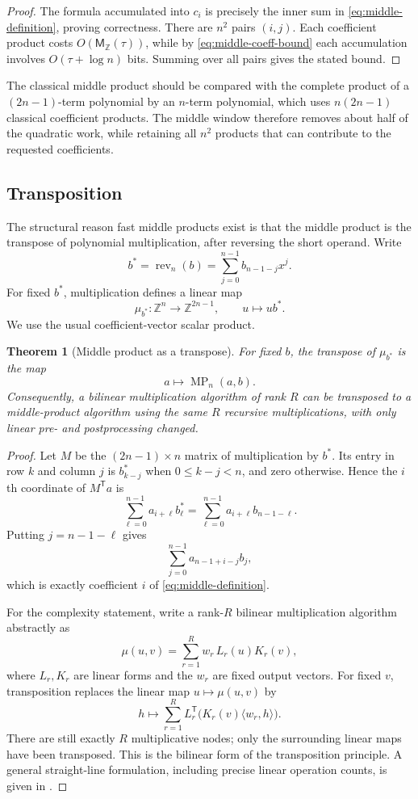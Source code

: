 \documentclass[11pt]{book}
\newtheorem{theorem}{Theorem}[section]
\theoremstyle{definition}
\newcommand{\ZZ}{\mathbb Z}
\newcommand{\MZ}{\mathsf M_{\ZZ}}
\begin{document}
\begin{proof}
The formula accumulated into $c_i$ is precisely the inner sum in
\eqref{eq:middle-definition}, proving correctness.  There are $n^2$ pairs
$(i,j)$.  Each coefficient product costs $O(\MZ(\tau))$, while by
\eqref{eq:middle-coeff-bound} each accumulation involves
$O(\tau+\log n)$ bits.  Summing over all pairs gives the stated bound.
\end{proof}

The classical middle product should be compared with the complete product of a
$(2n-1)$-term polynomial by an $n$-term polynomial, which uses
$n(2n-1)$ classical coefficient products.  The middle window therefore removes
about half of the quadratic work, while retaining all $n^2$ products that can
contribute to the requested coefficients.

\subsection{Transposition}

The structural reason fast middle products exist is that the middle product is
the transpose of polynomial multiplication, after reversing the short
operand.  Write
\[
 b^*=\operatorname{rev}_n(b)
      =\sum_{j=0}^{n-1}b_{n-1-j}x^j.
\]
For fixed $b^*$, multiplication defines a linear map
\[
 \mu_{b^*}:\ZZ^n\longrightarrow\ZZ^{2n-1},
 \qquad u\longmapsto u b^*.
\]
We use the usual coefficient-vector scalar product.

\begin{theorem}[Middle product as a transpose]\label{thm:middle-transpose}
For fixed $b$, the transpose of $\mu_{b^*}$ is the map
\[
 a\longmapsto\operatorname{MP}_n(a,b).
\]
Consequently, a bilinear multiplication algorithm of rank $R$ can be
transposed to a middle-product algorithm using the same $R$ recursive
multiplications, with only linear pre- and postprocessing changed.
\end{theorem}

\begin{proof}
Let $M$ be the $(2n-1)\times n$ matrix of multiplication by $b^*$.
Its entry in row $k$ and column $j$ is
$b^*_{k-j}$ when $0\leq k-j<n$, and zero otherwise.  Hence the $i$th
coordinate of $M^{\mathsf T}a$ is
\[
 \sum_{\ell=0}^{n-1}a_{i+\ell}b^*_{\ell}
 =\sum_{\ell=0}^{n-1}a_{i+\ell}b_{n-1-\ell}.
\]
Putting $j=n-1-\ell$ gives
\[
 \sum_{j=0}^{n-1}a_{n-1+i-j}b_j,
\]
which is exactly coefficient $i$ of \eqref{eq:middle-definition}.

For the complexity statement, write a rank-$R$ bilinear multiplication
algorithm abstractly as
\[
 \mu(u,v)=\sum_{r=1}^{R} w_r\,L_r(u)K_r(v),
\]
where $L_r,K_r$ are linear forms and the $w_r$ are fixed output vectors.
For fixed $v$, transposition replaces the linear map
$u\mapsto\mu(u,v)$ by
\[
 h\longmapsto
 \sum_{r=1}^{R}L_r^{\mathsf T}
 \bigl(K_r(v)\langle w_r,h\rangle\bigr).
\]
There are still exactly $R$ multiplicative nodes; only the surrounding linear
maps have been transposed.  This is the bilinear form of the transposition
principle.  A general straight-line formulation, including precise linear
operation counts, is given in \cite{BostanLecerfSchost2003}.
\end{proof}
\end{document}
